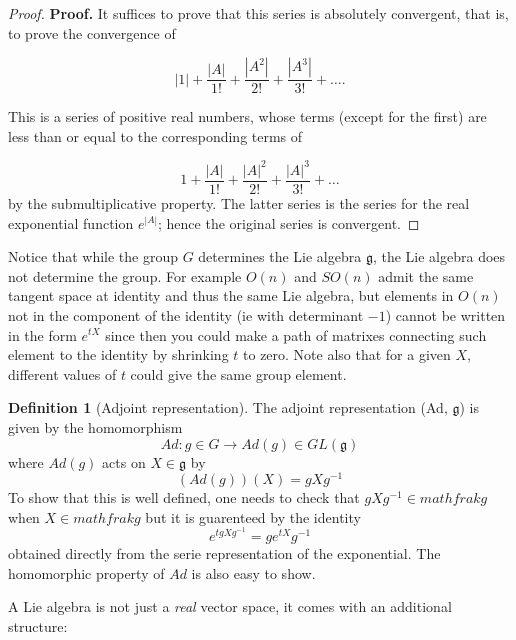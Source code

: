 \documentclass[11pt,a4paper]{article}
\theoremstyle{definition}
\newtheorem{definition}{Definition}[section]
\numberwithin{equation}{section}
\begin{document}
\begin{proof}
\textbf{Proof.} It suffices to prove that this series is absolutely convergent, that is, to prove the convergence of

\begin{equation*}
|1| + \frac{|A|}{1!} + \frac{|A^2|}{2!} + \frac{|A^3|}{3!} + \dots.
\end{equation*}

This is a series of positive real numbers, whose terms (except for the first) are less than or equal to the corresponding terms of

\begin{equation*}
1 + \frac{|A|}{1!} + \frac{|A|^2}{2!} + \frac{|A|^3}{3!} + \dots
\end{equation*}
by the submultiplicative property. The latter series is the series for the real exponential function \( e^{|A|} \); hence the original series is convergent.
\end{proof}
Notice that while the group $G$ determines the Lie algebra $\mathfrak{g}$, the Lie algebra does not determine the group. For example $O(n)$ and $SO(n)$ admit the same tangent space at identity and thus the same Lie algebra, but elements in $O(n)$ not in the component of the identity (ie with determinant $-1$) cannot be written in the form $e^{tX}$ since then you could make a path of matrixes connecting such element to the identity by shrinking $t$ to zero.
Note also that for a given $X$, different values of $t$ could give the same group element.
\begin{definition}[Adjoint representation]
    The adjoint representation (Ad, $\mathfrak{g}$) is given by the homomorphism
    \begin{equation*}
        Ad:g\in G \rightarrow Ad(g)\in GL(\mathfrak{g})
    \end{equation*}
    where $Ad(g)$ acts on $X\in \mathfrak{g}$ by
    \begin{equation*}
        (Ad(g))(X) = gXg^{-1}
    \end{equation*}
    To show that this is well defined, one needs to check that $gXg^{-1} \in mathfrak{g}$ when $X \in mathfrak{g}$ but it is guarenteed by the identity
    \begin{equation*}
        e^{tgXg^{-1}} = ge^{tX}g^{-1}
    \end{equation*}
    obtained directly from the serie representation of the exponential.
    The homomorphic property of $Ad$ is also easy to show.
\end{definition}
A Lie algebra is not just a \textit{real} vector space, it comes with an additional structure:
\end{document}
